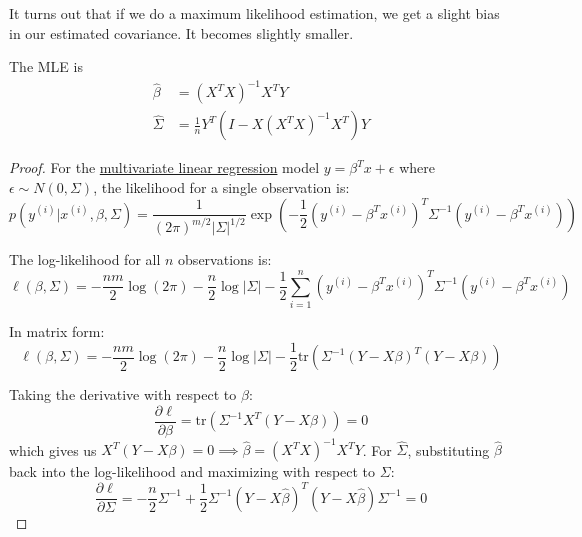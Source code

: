   It turns out that if we do a maximum likelihood estimation, we get a slight bias in our estimated covariance. It becomes slightly smaller. 

  \begin{theorem}
    \label{thm:mle-solution}
    The MLE is 
    \begin{align}
      \hat{\beta} & = (X^T X)^{-1} X^T Y \\ 
      \hat{\Sigma} & = \frac{1}{n} Y^T (I - X (X^T X)^{-1} X^T) Y
    \end{align}
  \end{theorem}
  \begin{proof}
    For the \hyperref[def:multivariate-linear-regression]{multivariate linear regression} model $y = \beta^T x + \epsilon$ where $\epsilon \sim N(0, \Sigma)$, the likelihood for a single observation is:
    \begin{equation}
      p(y^{(i)} | x^{(i)}, \beta, \Sigma) = \frac{1}{(2\pi)^{m/2}|\Sigma|^{1/2}} \exp\left(-\frac{1}{2}(y^{(i)} - \beta^T x^{(i)})^T \Sigma^{-1} (y^{(i)} - \beta^T x^{(i)})\right)
    \end{equation}
   
    The log-likelihood for all $n$ observations is:
    \begin{equation}
      \ell(\beta, \Sigma) = -\frac{nm}{2}\log(2\pi) - \frac{n}{2}\log|\Sigma| - \frac{1}{2}\sum_{i=1}^n (y^{(i)} - \beta^T x^{(i)})^T \Sigma^{-1} (y^{(i)} - \beta^T x^{(i)})
    \end{equation}
   
    In matrix form:
    \begin{equation}
      \ell(\beta, \Sigma) = -\frac{nm}{2}\log(2\pi) - \frac{n}{2}\log|\Sigma| - \frac{1}{2}\text{tr}(\Sigma^{-1}(Y - X\beta)^T(Y - X\beta))
    \end{equation}
   
    Taking the derivative with respect to $\beta$:
    \begin{equation}
      \frac{\partial \ell}{\partial \beta} = \text{tr}(\Sigma^{-1}X^T(Y - X\beta)) = 0
    \end{equation}
    which gives us $X^T(Y - X\beta) = 0 \implies \hat{\beta} = (X^TX)^{-1}X^TY$. For $\hat{\Sigma}$, substituting $\hat{\beta}$ back into the log-likelihood and maximizing with respect to $\Sigma$:
    \begin{equation}
      \frac{\partial \ell}{\partial \Sigma} = -\frac{n}{2}\Sigma^{-1} + \frac{1}{2}\Sigma^{-1}(Y - X\hat{\beta})^T(Y - X\hat{\beta})\Sigma^{-1} = 0
    \end{equation}
   

\end{proof}
